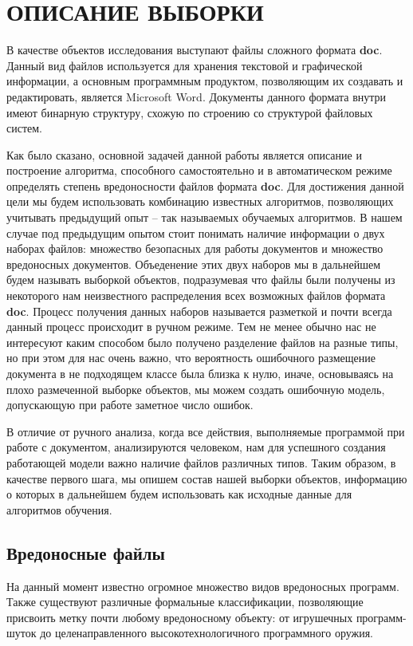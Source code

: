 \chapter{ОПИСАНИЕ ВЫБОРКИ}

В качестве объектов исследования выступают файлы сложного формата \textbf{doc}.
Данный вид файлов используется для хранения текстовой и графической информации, а основным программным продуктом, позволяющим их создавать и редактировать, является Microsoft Word.
Документы данного формата внутри имеют бинарную структуру, схожую по строению со структурой файловых систем. \cite{doc_format}

Как было сказано, основной задачей данной работы является описание и построение алгоритма, способного самостоятельно и в автоматическом режиме определять степень вредоносности файлов формата \textbf{doc}.
Для достижения данной цели мы будем использовать комбинацию известных алгоритмов, позволяющих учитывать предыдущий опыт -- так называемых обучаемых алгоритмов.
В нашем случае под предыдущим опытом стоит понимать наличие информации о двух наборах файлов: множество безопасных для работы документов и множество вредоносных документов.
Объеденение этих двух наборов мы в дальнейшем будем называть выборкой объектов, подразумевая что файлы были получены из некоторого нам неизвестного распределения всех возможных файлов формата \textbf{doc}. 
Процесс получения данных наборов называется разметкой и почти всегда данный процесс происходит в ручном режиме.
Тем не менее обычно нас не интересуют каким способом было получено разделение файлов на разные типы, но при этом для нас очень важно, что вероятность ошибочного размещение документа в не подходящем классе была близка к нулю, иначе, основываясь на плохо размеченной выборке объектов, мы можем создать ошибочную модель, допускающую при работе заметное число ошибок.

В отличие от ручного анализа, когда все действия, выполняемые программой при работе с документом, анализируются человеком, нам для успешного создания работающей модели важно наличие файлов различных типов.
Таким образом, в качестве первого шага, мы опишем состав нашей выборки объектов, информацию о которых в дальнейшем будем использовать как исходные данные для алгоритмов обучения.

\section{Вредоносные файлы}

На данный момент известно огромное множество видов вредоносных программ.
Также существуют различные формальные классификации, позволяющие присвоить метку почти любому вредоносному объекту: от игрушечных программ-шуток до целенаправленного высокотехнологичного программного оружия.

